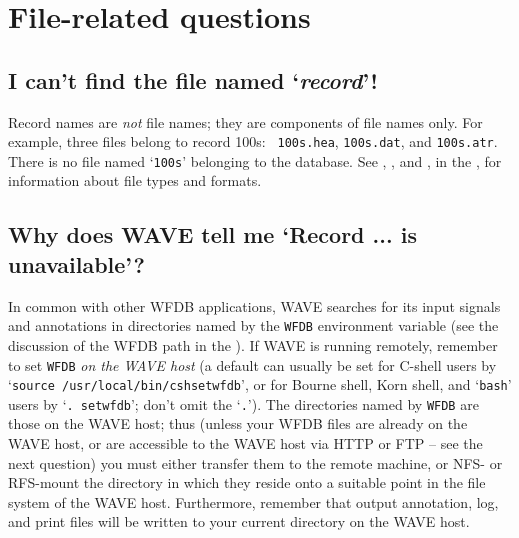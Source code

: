 \documentclass[twoside]{book}
\newcommand{\WAVE}{{\sf WAVE}\xspace}
\begin{document}
\section{File-related questions}
\label{faq:file-related-questions}

\subsection{I can't find the file named `\emph{record}'!}

\label{faq:cannot-find-record}
Record names are \emph{not} file names; they are components of file
names only.  For example, three files belong to record 100s: {\tt
100s.hea}, {\tt 100s.dat}, and {\tt 100s.atr}. There is no file named
`{\tt 100s}' belonging to the database.  See
,
, and
, in the
,
for information about file types and formats.

\subsection{Why does \WAVE{} tell me `Record ... is unavailable'?}

In common with other WFDB applications, \WAVE{} searches for its input
signals and annotations in directories named by the {\tt WFDB}
environment variable (see the discussion of the WFDB path in the 
).
If \WAVE{} is running remotely,
remember to set {\tt WFDB} \emph{on the \WAVE{} host}
\index{WAVE host@\WAVE{} host}
(a default can
usually be set for C-shell users by `{\tt source
/usr/local/bin/cshsetwfdb}', or for Bourne shell, Korn shell, and `{\tt bash}'
users by `{\tt .~setwfdb}'; don't omit the `{\tt .}').  The directories
named by {\tt WFDB} are those on the \WAVE{} host; thus (unless your WFDB
files are already on the \WAVE{} host, or are accessible to the \WAVE{} host
via HTTP or FTP -- see the next question) you must either transfer them
to the remote machine, or NFS- or RFS-mount the directory in which they reside
onto a suitable point in the file system of the \WAVE{} host.  Furthermore,
remember that output annotation, log, and print files will be written
to your current directory on the \WAVE{} host.
\end{document}
